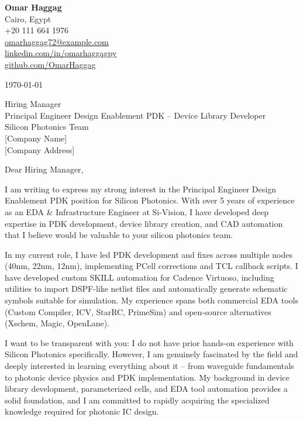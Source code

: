 \documentclass[11pt,a4paper]{article}
\begin{document}
\pagestyle{empty}

\begin{flushleft}
\textbf{Omar Haggag}\\
Cairo, Egypt\\
+20 111 664 1976\\
\href{mailto:omarhaggag72@example.com}{omarhaggag72@example.com}\\
\href{https://linkedin.com/in/omarhaggagpy}{linkedin.com/in/omarhaggagpy}\\
\href{https://github.com/OmarHaggag}{github.com/OmarHaggag}
\end{flushleft}

\vspace{1em}
\begin{flushright}
\today
\end{flushright}

\vspace{1em}
\begin{flushleft}
Hiring Manager\\
Principal Engineer Design Enablement PDK -- Device Library Developer\\
Silicon Photonics Team\\
{[}Company Name{]}\\
{[}Company Address{]}
\end{flushleft}

\vspace{1em}
Dear Hiring Manager,

I am writing to express my strong interest in the Principal Engineer Design Enablement PDK position for Silicon Photonics. With over 5 years of experience as an EDA \& Infrastructure Engineer at Si-Vision, I have developed deep expertise in PDK development, device library creation, and CAD automation that I believe would be valuable to your silicon photonics team.

In my current role, I have led PDK development and fixes across multiple nodes (40nm, 22nm, 12nm), implementing PCell corrections and TCL callback scripts. I have developed custom SKILL automation for Cadence Virtuoso, including utilities to import DSPF-like netlist files and automatically generate schematic symbols suitable for simulation. My experience spans both commercial EDA tools (Custom Compiler, ICV, StarRC, PrimeSim) and open-source alternatives (Xschem, Magic, OpenLane).

I want to be transparent with you: I do not have prior hands-on experience with Silicon Photonics specifically. However, I am genuinely fascinated by the field and deeply interested in learning everything about it -- from waveguide fundamentals to photonic device physics and PDK implementation. My background in device library development, parameterized cells, and EDA tool automation provides a solid foundation, and I am committed to rapidly acquiring the specialized knowledge required for photonic IC design.
\end{document}
